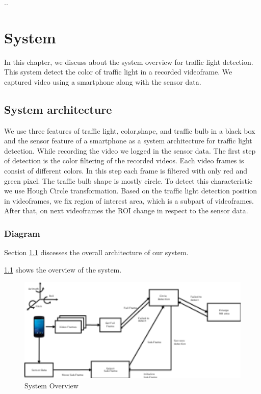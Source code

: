 ..\chapter{System}
In this chapter, we discuss about the system overview for traffic light detection.
This system detect the color of traffic light in a recorded videoframe.
We captured video using a smartphone along with the sensor data.

\section{System architecture}
\label{s:archi}
We use three features of traffic light, color,shape, and traffic bulb in a black box and the sensor feature of a smartphone as a system architecture for traffic light detection.
While recording the video we logged in the sensor data.
The first step of detection is the color filtering of the recorded videos.
Each video frames is consist of different colors.
In this step each frame is filtered with only red and green pixel.
The traffic bulb shape is mostly circle.
To detect this characteristic we use Hough Circle  transformation\cite{hough_circle}.
Based on the traffic light detection position in videoframes, we fix region of interest area, which is a subpart of videoframes.
After that, on next videoframes the ROI change in respect to the sensor data. 

\subsection{Diagram}

Section \ref{s:archi} discesses the overall architecture of our system.

\ref{f:sys_dia} shows the overview of the system.

\begin{figure}
\centering
\includegraphics[width=5.2in]{figures/sysdia.png}
\caption{System Overview}
\label{f:sys_dia}
\end{figure}

